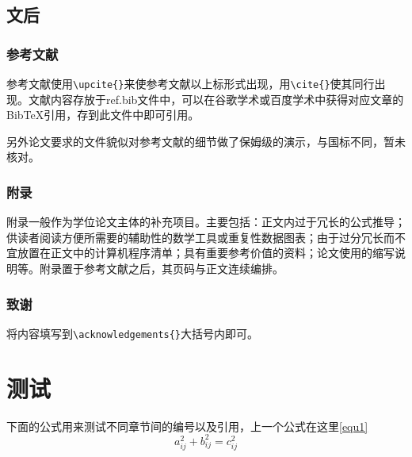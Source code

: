 \documentclass{bucthesis}
\begin{document}
\section{文后}
\subsection{参考文献}{\par
	参考文献使用\verb|\upcite{}|来使参考文献以上标形式出现，用\verb|\cite{}|使其同行出现。文献内容存放于ref.bib文件中，可以在谷歌学术或百度学术中获得对应文章的BibTeX引用，存到此文件中即可引用。\par
	另外论文要求的文件貌似对参考文献的细节做了保姆级的演示，与国标不同，暂未核对。}
\subsection{附录}{\par
	附录一般作为学位论文主体的补充项目。主要包括：正文内过于冗长的公式推导；供读者阅读方便所需要的辅助性的数学工具或重复性数据图表；由于过分冗长而不宜放置在正文中的计算机程序清单；具有重要参考价值的资料；论文使用的缩写说明等。附录置于参考文献之后，其页码与正文连续编排。}
\subsection{致谢}{\par
	将内容填写到\verb|\acknowledgements{}|大括号内即可。\par}
\chapter{测试}{\par
	下面的公式用来测试不同章节间的编号以及引用，上一个公式在这里\ref{equ1}
	\begin{equation}
	a^2_{ij}+b^2_{ij}=c^2_{ij}
	\end{equation}}

{

}
	
\end{document}
